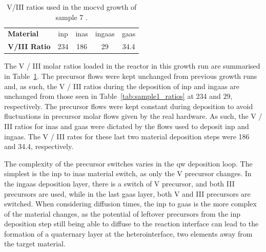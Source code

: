 \begin{table}
  \centering
  \caption{V/III ratios used in the \acs{mocvd} growth of sample 7 \cite{Brugnolotto2023_2}.}
  \label{tbl:s7_ratios}
  \begin{tabular}{l|cccc}
    \textbf{Material}    & \acs{inp}  & \acs{inas} & \acs{ingaas}   & \acs{gaas} \\
    \textbf{V/III Ratio} & \num{234} & \num{186} & \num{29}      & \num{34.4}  \\
    \hline \hline
  \end{tabular}
\end{table}

The V / III molar ratios loaded in the reactor in this growth run are summarised in Table~\ref{tbl:s7_ratios}. The precursor flows were kept unchanged from previous growth runs and, as such, the V / III ratios during the deposition of \acs{inp} and \acs{ingaas} are unchanged from those seen in Table~\ref{tab:sample1_ratios} at \num{234} and \num{29}, respectively. The precursor flows were kept constant during deposition to avoid fluctuations in precursor molar flows given by the real hardware. As such, the V / III ratios for \acs{inas} and \acs{gaas} were dictated by the flows used to deposit \acs{inp} and \acs{ingaas}. The V / III rates for these last two material deposition steps were \num{186} and \num{34.4}, respectively. 

The complexity of the precursor switches varies in the \acl{qw} deposition loop. The simplest is the \acs{inp} to \acs{inas} material switch, as only the V precursor changes. In the \acs{ingaas} deposition layer, there is a switch of V precursor, and both III precursors are used, while in the last \acs{gaas} layer, both V and III precursors are switched. When considering diffusion times, the \acs{inp} to \acs{gaas} is the more complex of the material changes, as the potential of leftover precursors from the \acs{inp} deposition step still being able to diffuse to the reaction interface can lead to the formation of a quaternary  layer at the heterointerface, two elements away from the target material.

